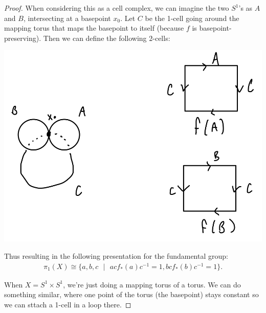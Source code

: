 \documentclass[12pt]{article}
\begin{document}
\begin{proof}
  When considering this as a cell complex, we can imagine the two $S^1$'s as $A$ and $B$, intersecting at a basepoint $x_0$. Let 
  $C$ be the 1-cell going around the mapping torus that maps the basepoint to itself (because $f$ is basepoint-preserving).
  Then we can define the following $2$-cells:
  \par \begin{center} \includegraphics[scale=.2]{5-1.png} \end{center} 
  \par Thus resulting in the following presentation for the fundamental group:
  \begin{align*}
  \pi_1(X) \cong \{ a,b,c \text{ }|\text{ } acf_*(a)c^{-1}=1, bcf_*(b)c^{-1}=1  \}.
  \end{align*}
  \par When $X=S^1 \times S^1$, we're just doing a mapping torus of a torus. We can do something similar, where one point of the torus (the basepoint)
  stays constant so we can sttach a 1-cell in a loop there.

\end{proof}
\end{document}
